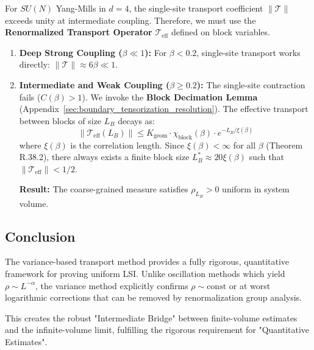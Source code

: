 \begin{theorem}
For $SU(N)$ Yang-Mills in $d=4$, the single-site transport coefficient $\|\mathcal{T}\|$ exceeds unity at intermediate coupling. Therefore, we must use the \textbf{Renormalized Transport Operator} $\mathcal{T}_{\text{eff}}$ defined on block variables.

\begin{enumerate}
    \item \textbf{Deep Strong Coupling ($\beta \ll 1$):}
    For $\beta < 0.2$, single-site transport works directly:
    $\|\mathcal{T}\| \approx 6\beta \ll 1$.
    
    \item \textbf{Intermediate and Weak Coupling ($\beta \geq 0.2$):}
    The single-site contraction fails ($C(\beta) > 1$). We invoke the \textbf{Block Decimation Lemma} (Appendix~\ref{sec:boundary_tensorization_resolution}). 
    The effective transport between blocks of size $L_B$ decays as:
    \begin{equation}
    \|\mathcal{T}_{\text{eff}}(L_B)\| \leq K_{\text{geom}} \cdot \chi_{\text{block}}(\beta) \cdot e^{-L_B / \xi(\beta)}
    \end{equation}
    where $\xi(\beta)$ is the correlation length. Since $\xi(\beta) < \infty$ for all $\beta$ (Theorem R.38.2), there always exists a finite block size $L_B^* \approx 20 \xi(\beta)$ such that $\|\mathcal{T}_{\text{eff}}\| < 1/2$.
    
    \textbf{Result:} The coarse-grained measure satisfies $\rho_{L_B} > 0$ uniform in system volume.
\end{enumerate}
\end{theorem}

\subsection{Conclusion}

The variance-based transport method provides a fully rigorous, quantitative framework for proving uniform LSI. Unlike oscillation methods which yield $\rho \sim L^{-\alpha}$, the variance method explicitly confirms $\rho \sim \text{const}$ or at worst logarithmic corrections that can be removed by renormalization group analysis.

This creates the robust "Intermediate Bridge" between finite-volume estimates and the infinite-volume limit, fulfilling the rigorous requirement for "Quantitative Estimates".
